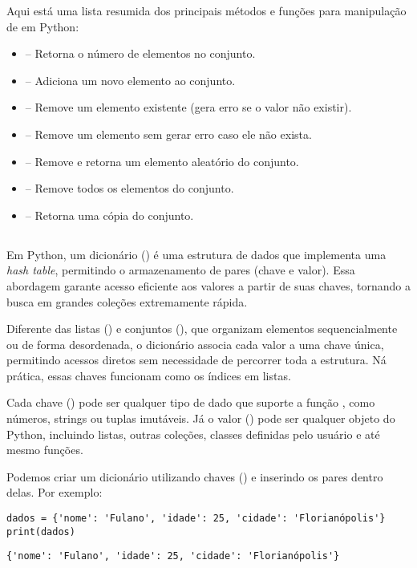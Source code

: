 Aqui está uma lista resumida dos principais métodos e funções para manipulação de  em Python:
\begin{itemize}
\item {} – Retorna o número de elementos no conjunto.
\item {} – Adiciona um novo elemento ao conjunto.
\item {} – Remove um elemento existente (gera erro se o valor não existir).
\item {} – Remove um elemento sem gerar erro caso ele não exista.
\item {} – Remove e retorna um elemento aleatório do conjunto.
\item {} – Remove todos os elementos do conjunto.
\item {} – Retorna uma cópia do conjunto.
\end{itemize}


\subsection{}

Em Python, um dicionário () é uma estrutura de dados que implementa uma \emph{hash table}, permitindo o armazenamento de pares
 (chave e valor).
Essa abordagem garante acesso eficiente aos valores a partir de suas chaves, tornando a busca em grandes coleções
extremamente rápida.

Diferente das listas () e conjuntos (), que organizam elementos sequencialmente ou de forma desordenada,
o dicionário associa cada valor a uma chave única, permitindo acessos diretos sem necessidade de percorrer toda a
estrutura. Ná prática, essas chaves funcionam como os índices em listas.

Cada chave () pode ser qualquer tipo de dado que suporte a função , como números, strings
ou tuplas imutáveis.
Já o valor () pode ser qualquer objeto do Python, incluindo listas, outras coleções, classes definidas
pelo usuário e até mesmo funções.

Podemos criar um dicionário utilizando chaves (\inlcode{\{\}}) e inserindo os pares  dentro delas.
Por exemplo:
\begin{verbatim}
dados = {'nome': 'Fulano', 'idade': 25, 'cidade': 'Florianópolis'}
print(dados)
\end{verbatim}
\begin{verbatim}
{'nome': 'Fulano', 'idade': 25, 'cidade': 'Florianópolis'}
\end{verbatim}

